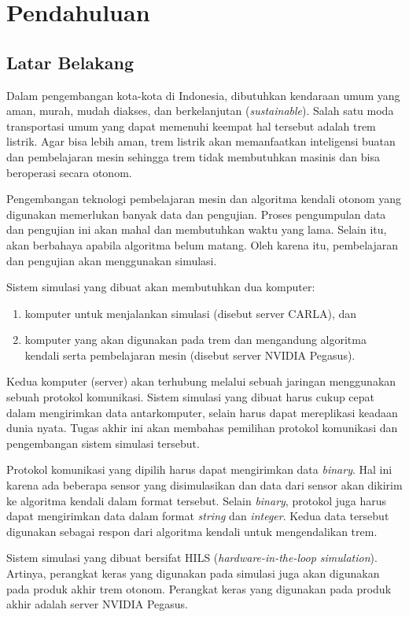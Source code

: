 \chapter{Pendahuluan}

\section{Latar Belakang}

Dalam pengembangan kota-kota di Indonesia, dibutuhkan kendaraan umum yang aman,
murah, mudah diakses, dan berkelanjutan (\textit{sustainable}). Salah satu moda
transportasi umum yang dapat memenuhi keempat hal tersebut adalah trem listrik.
Agar bisa lebih aman, trem listrik akan memanfaatkan inteligensi buatan dan
pembelajaran mesin sehingga trem tidak membutuhkan masinis dan bisa beroperasi
secara otonom.

Pengembangan teknologi pembelajaran mesin dan algoritma kendali otonom yang
digunakan memerlukan banyak data dan pengujian. Proses pengumpulan data dan
pengujian ini akan mahal dan membutuhkan waktu yang lama. Selain itu, akan
berbahaya apabila algoritma belum matang. Oleh karena itu, pembelajaran dan
pengujian akan menggunakan simulasi.

Sistem simulasi yang dibuat akan membutuhkan dua komputer:
\begin{enumerate}
	\item komputer untuk menjalankan simulasi (disebut server CARLA), dan
	\item komputer yang akan digunakan pada trem dan mengandung algoritma
	      kendali serta pembelajaran mesin (disebut server NVIDIA Pegasus).
\end{enumerate}
Kedua komputer (server) akan terhubung melalui sebuah jaringan menggunakan
sebuah protokol komunikasi. Sistem simulasi yang dibuat harus cukup cepat dalam
mengirimkan data antarkomputer, selain harus dapat mereplikasi keadaan dunia
nyata. Tugas akhir ini akan membahas pemilihan protokol komunikasi dan
pengembangan sistem simulasi tersebut.

Protokol komunikasi yang dipilih harus dapat mengirimkan data \textit{binary}.
Hal ini karena ada beberapa sensor yang disimulasikan dan data dari sensor
akan dikirim ke algoritma kendali dalam format tersebut. Selain \textit{binary},
protokol juga harus dapat mengirimkan data dalam format \textit{string} dan
\textit{integer}. Kedua data tersebut digunakan sebagai respon dari algoritma
kendali untuk mengendalikan trem.

Sistem simulasi yang dibuat bersifat HILS (\textit{hardware-in-the-loop
	simulation}). Artinya, perangkat keras yang digunakan pada simulasi juga akan
digunakan pada produk akhir trem otonom. Perangkat keras yang digunakan pada
produk akhir adalah server NVIDIA Pegasus.

